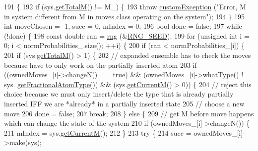 \begin{DoxyCode}
191                                     \{
192     \textcolor{keywordflow}{if} (sys.\hyperlink{classsim_system_aa4ad1afff101bb530e1590df05035276}{getTotalM}() != M\_) \{
193         \textcolor{keywordflow}{throw} \hyperlink{classcustom_exception}{customException} (\textcolor{stringliteral}{"Error, M in system different from M in moves class operating
       on the system"});
194     \}
195     \textcolor{keywordtype}{int} moveChosen = -1, succ = 0, mIndex = 0;
196     \textcolor{keywordtype}{bool} done = \textcolor{keyword}{false};
197     \textcolor{keywordflow}{while} (!done) \{
198         \textcolor{keyword}{const} \textcolor{keywordtype}{double} ran = \hyperlink{utilities_8cpp_a0f9542af4b475ac79cb679d7a8d14db0}{rng} (&\hyperlink{global_8h_a3f4e4ea24d5a5c66feae55d1f329c884}{RNG\_SEED});
199         \textcolor{keywordflow}{for} (\textcolor{keywordtype}{unsigned} \textcolor{keywordtype}{int} i = 0; i < normProbabilities\_.size(); ++i) \{
200             \textcolor{keywordflow}{if} (ran < normProbabilities\_[i]) \{
201                 \textcolor{keywordflow}{if} (sys.\hyperlink{classsim_system_aa4ad1afff101bb530e1590df05035276}{getTotalM}() > 1) \{
202                     \textcolor{comment}{// expanded ensemble has to check the moves because have to only work on the partially
       inserted atom}
203                     \textcolor{keywordflow}{if} ((ownedMoves\_[i]->changeN() == \textcolor{keyword}{true}) && (ownedMoves\_[i]->whatType() != sys.
      \hyperlink{classsim_system_a0500a9e84eecfbde7a98cf8a34f719d5}{getFractionalAtomType}()) && (sys.\hyperlink{classsim_system_a299fe4372e610b554eaaf5f5957b2dbc}{getCurrentM}() > 0)) \{
204                         \textcolor{comment}{// reject this choice because we must only insert/delete the type that is already
       partially inserted IFF we are *already* in a partially inserted state}
205                         \textcolor{comment}{// choose a new move}
206                         done = \textcolor{keyword}{false};
207                         \textcolor{keywordflow}{break};
208                     \} \textcolor{keywordflow}{else} \{
209                         \textcolor{comment}{// get M before move happens which can change the state of the system}
210                         \textcolor{keywordflow}{if} (ownedMoves\_[i]->changeN()) \{
211                             mIndex = sys.\hyperlink{classsim_system_a299fe4372e610b554eaaf5f5957b2dbc}{getCurrentM}();
212                         \}
213                         \textcolor{keywordflow}{try} \{
214                             succ = ownedMoves\_[i]->make(sys);

\end{DoxyCode}

